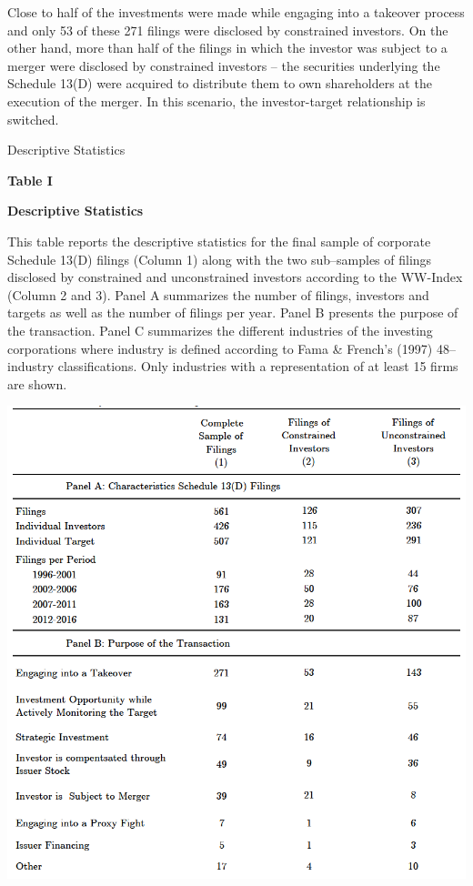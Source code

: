 \documentclass[12pt]{article}
\begin{document}
Close to half of the investments were made while engaging into a takeover process and only 53 of these 271 filings were disclosed by constrained investors. On the other hand, more than half of the filings in which the investor was subject to a merger were disclosed by constrained investors -- the securities underlying the Schedule 13(D) were acquired to distribute them to own shareholders at the execution of the merger. In this scenario, the investor-target relationship is switched.

\begin{table}[!htbp]
	\centering
	\captionsetup{textformat=empty,labelformat=blank}
	\caption{Descriptive Statistics}
	\textbf{Table I}\par\medskip
	\large\textbf{Descriptive Statistics}\par\medskip
	\justifying
	\footnotesize\noindent{}This table reports the descriptive statistics for the final sample of corporate Schedule 13(D) filings (Column 1) along with the two sub–samples of filings disclosed by constrained and unconstrained investors according to the WW-Index (Column 2 and 3). Panel A summarizes the number of filings, investors and targets as well as the number of filings per year. Panel B presents the purpose of the transaction. Panel C summarizes the different industries of the investing corporations where industry is defined according to Fama \& French’s (1997) 48–industry classifications. Only industries with a representation of at least 15 firms are shown.\par\medskip
	\centering													
	\begin{adjustbox}{width=\textwidth}
		\includegraphics{descriptive1final}
	\end{adjustbox}\par\medskip
\end{table}
\end{document}
